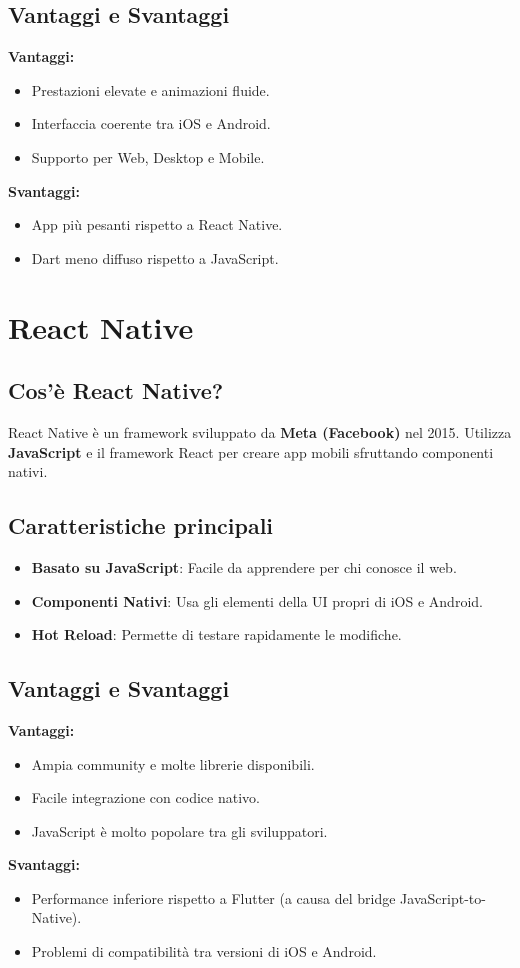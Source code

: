 \documentclass[a4paper,10pt]{article}
\begin{document}
\subsection{Vantaggi e Svantaggi}
\textbf{Vantaggi:}
\begin{itemize}
    \item Prestazioni elevate e animazioni fluide.
    \item Interfaccia coerente tra iOS e Android.
    \item Supporto per Web, Desktop e Mobile.
\end{itemize}
\textbf{Svantaggi:}
\begin{itemize}
    \item App più pesanti rispetto a React Native.
    \item Dart meno diffuso rispetto a JavaScript.
\end{itemize}

\section{React Native}
\subsection{Cos’è React Native?}
React Native è un framework sviluppato da \textbf{Meta (Facebook)} nel 2015. Utilizza \textbf{JavaScript} e il framework React per creare app mobili sfruttando componenti nativi.

\subsection{Caratteristiche principali}
\begin{itemize}
    \item \textbf{Basato su JavaScript}: Facile da apprendere per chi conosce il web.
    \item \textbf{Componenti Nativi}: Usa gli elementi della UI propri di iOS e Android.
    \item \textbf{Hot Reload}: Permette di testare rapidamente le modifiche.
\end{itemize}

\subsection{Vantaggi e Svantaggi}
\textbf{Vantaggi:}
\begin{itemize}
    \item Ampia community e molte librerie disponibili.
    \item Facile integrazione con codice nativo.
    \item JavaScript è molto popolare tra gli sviluppatori.
\end{itemize}
\textbf{Svantaggi:}
\begin{itemize}
    \item Performance inferiore rispetto a Flutter (a causa del bridge JavaScript-to-Native).
    \item Problemi di compatibilità tra versioni di iOS e Android.
\end{itemize}
\end{document}
